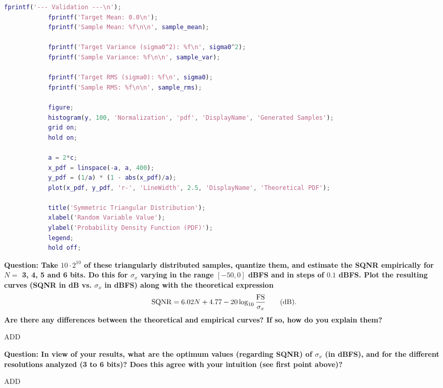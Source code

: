 \documentclass[11pt,a4paper]{article}
\begin{document}
\begin{itemize}
\begin{lstlisting}[language=Matlab]
            fprintf('--- Validation ---\n');
            fprintf('Target Mean: 0.0\n');
            fprintf('Sample Mean: %f\n\n', sample_mean);

            fprintf('Target Variance (sigma0^2): %f\n', sigma0^2);
            fprintf('Sample Variance: %f\n\n', sample_var);

            fprintf('Target RMS (sigma0): %f\n', sigma0);
            fprintf('Sample RMS: %f\n\n', sample_rms);

            figure;
            histogram(y, 100, 'Normalization', 'pdf', 'DisplayName', 'Generated Samples');
            grid on;
            hold on;

            a = 2*c;
            x_pdf = linspace(-a, a, 400);
            y_pdf = (1/a) * (1 - abs(x_pdf)/a);
            plot(x_pdf, y_pdf, 'r-', 'LineWidth', 2.5, 'DisplayName', 'Theoretical PDF');

            title('Symmetric Triangular Distribution');
            xlabel('Random Variable Value');
            ylabel('Probability Density Function (PDF)');
            legend;
            hold off;
        \end{lstlisting}
\end{itemize}

\vspace{1cm}
\textbf{Question: Take $10\cdot 2^{10}$ of these triangularly distributed samples, quantize them, and estimate the SQNR empirically
    for $N=$ 3, 4, 5 and 6 bits. Do this for $\sigma_x$ varying in the range $[-50, 0]$ dBFS and in steps of $0.1$ dBFS. Plot the
    resulting curves (SQNR in dB vs. $\sigma_x$ in dBFS) along with the theoretical expression
    \begin{equation}\label{eq:sqnr}
        {\rm SQNR} = 6.02 N + 4.77-20\log_{10}\frac{\rm FS}{\sigma_x} \qquad \mbox{(dB).}
    \end{equation}
    Are there any differences between the theoretical and empirical curves? If so, how do you explain them?}
\vspace{0.5cm}

ADD

\vspace{1cm}
\textbf{Question: In view of your results, what are the optimum values (regarding SQNR) of $\sigma_x$ (in dBFS), and for the different resolutions analyzed (3 to 6 bits)?
    Does this agree with your intuition (see first point above)?
}
\vspace{0.5cm}

ADD
\end{document}
